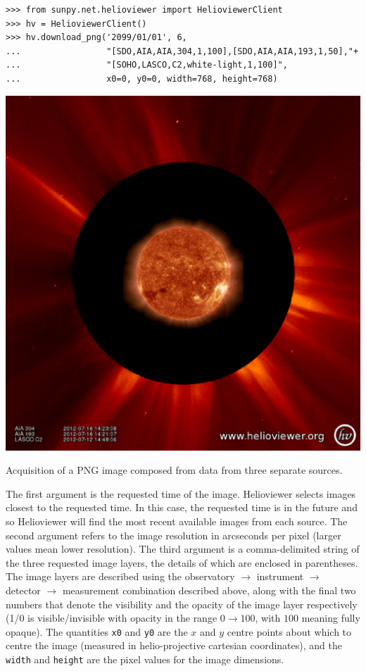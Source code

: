 \begin{listing}[H]
\begin{verbatim}
>>> from sunpy.net.helioviewer import HelioviewerClient
>>> hv = HelioviewerClient()
>>> hv.download_png('2099/01/01', 6,
...                 "[SDO,AIA,AIA,304,1,100],[SDO,AIA,AIA,193,1,50],"+
...                 "[SOHO,LASCO,C2,white-light,1,100]",
...                 x0=0, y0=0, width=768, height=768)
\end{verbatim}
\begin{center}
\includegraphics[width=0.6\columnwidth]{helioviewer_overlay_example}
\end{center}
\caption{Acquisition of a PNG image composed from data from three
  separate sources.}
\label{code:hv:overlaid}
\end{listing}

The first argument is the requested time of the image.  Helioviewer
selects images closest to the requested time.  In this case, the
requested time is in the future and so Helioviewer will find the most
recent available images from each source.  The second argument refers
to the image resolution in arcseconds per pixel (larger values mean
lower resolution).  The third argument is a comma-delimited string of
the three requested image layers, the details of which are enclosed
in parentheses. The image layers are described using the observatory
$\rightarrow$ instrument $\rightarrow$ detector $\rightarrow$
measurement combination described above, along with the final two
numbers that denote the visibility and the opacity of the image layer
respectively (1/0 is visible/invisible with opacity in the range
$0\rightarrow100$, with $100$ meaning fully opaque).  The quantities
\texttt{x0} and \texttt{y0} are the $x$ and $y$ centre points about
which to centre the image (measured in helio-projective cartesian
coordinates), and the \texttt{width} and \texttt{height} are the pixel
values for the image dimensions.


